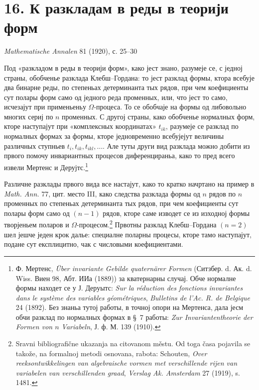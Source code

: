 \documentclass[11pt]{article}
\begin{document}

\section*{16. К разкладам в реды в теорији форм}
\begin{center}
\emph{Mathematische Annalen} 81 (1920), с. 25--30
\end{center}

Под «разкладом в реды в теорији форм», како јест знано, разумеје се, с једној страны, обобченье разклада Клебш--Гордана: то јест разклад формы, ктора всебује два бинарне реды, по степеньах детерминанта тых рядов, при чем коефициенты сут полары форм само од једного реда променных, или, что јест то само, исчезајут при применьеньу \(\Omega\)-процеса. То се обобчаје на формы од либовольно многих сериј по \(n\) променных. С другој страны, како обобченье нормалных форм, кторе наступајут при «комплексных координатах» \(t_{ik}\), разумеје се разклад по нормалных формах за формы, кторе једновременно всебујејут величины различных ступньев \(t_i,t_{ik},t_{ikl},\ldots\). Але туты други вид разклада можно добити из првого помочу инвариантных процесов диференцираньа, како то пред всего извели Мертенс и Дерујтс.\footnote{Ф. Мертенс, \emph{Über invariante Gebilde quaternärer Formen} (Ситзбер. d. Ак. d. Wiss. Виен 98, Абт. ИИа (1889)) за кватернарны случај. Обче нормалне формы находет се у Ј. Деруытс: \emph{Sur la réduction des fonctions invariantes dans le système des variables géométriques}, \emph{Bulletins de l'Ac. R. de Belgique} 24 (1892). Без знаньа тутој работы, в точној опори на Мертенса, дала јесм обчи разклад по нормалных формах в \S~7 работы: \emph{Zur Invariantentheorie der Formen von \(n\) Variabeln}, Ј. ф. М. 139 (1910).}

Различне разклады првого вида все настајут, како то кратко начртано на пример в \emph{Math. Ann.} 77, цит. место III, како следства разклада формы од \(n\) рядов по \(n\) променных по степеньах детерминанта тых рядов, при чем коефициенты сут полары форм само од \((n-1)\) рядов, кторе саме изводет се из изходној формы творјеньем поларов и \(\Omega\)-процесом.\footnote{Sravni bibliografične ukazanja na citovanom městu. Od toga časa pojavila se takože, na formalnoj metodi osnovana, rabota: Schouten, \emph{Over reeksontwikkelingen van algebraische vormen met verschillende rijen van variabelen van verschillenden graad}, \emph{Verslag Ak. Amsterdam} 27 (1919), s. 1481.} Првотны разклад Клебш--Гордана \((n=2)\) шел јешче једен крок далье: специалне поларны процесы, кторе тамо наступајут, подане сут експлицитно, чак с числовыми коефициентами.
\end{document}
